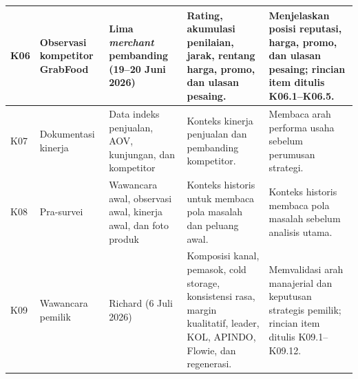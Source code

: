 \begin{xltabular}{\textwidth}{|C{1.0cm}|Z{2.8cm}|Z{2.4cm}|Y|L{3.6cm}|}
K06 & Observasi kompetitor GrabFood & Lima \textit{merchant} pembanding (19--20 Juni 2026) & Rating, akumulasi penilaian, jarak, rentang harga, promo, dan ulasan pesaing. & Menjelaskan posisi reputasi, harga, promo, dan ulasan pesaing; rincian item ditulis K06.1--K06.5. \\ \hline
K07 & Dokumentasi kinerja & Data indeks penjualan, AOV, kunjungan, dan kompetitor & Konteks kinerja penjualan dan pembanding kompetitor. & Membaca arah performa usaha sebelum perumusan strategi. \\ \hline
K08 & Pra-survei & Wawancara awal, observasi awal, kinerja awal, dan foto produk & Konteks historis untuk membaca pola masalah dan peluang awal. & Konteks historis membaca pola masalah sebelum analisis utama. \\ \hline
K09 & Wawancara pemilik & Richard (6 Juli 2026) & Komposisi kanal, pemasok, cold storage, konsistensi rasa, margin kualitatif, leader, KOL, APINDO, Flowie, dan regenerasi. & Memvalidasi arah manajerial dan keputusan strategis pemilik; rincian item ditulis K09.1--K09.12. \\ \hline
\end{xltabular}
\endgroup

